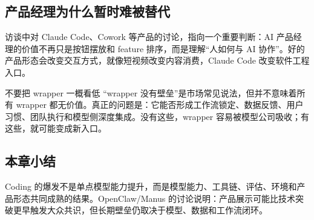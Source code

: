 \subsection{产品经理为什么暂时难被替代}

访谈中对 Claude Code、Cowork 等产品的讨论，指向一个重要判断：AI 产品经理的价值不再只是按钮摆放和 feature 排序，而是理解“人如何与 AI 协作”。好的产品形态会改变交互方式，就像短视频改变内容消费，Claude Code 改变软件工程入口。

\begin{warningbox}{不要把 wrapper 一概看低}
“wrapper 没有壁垒”是市场常见说法，但并不意味着所有 wrapper 都无价值。真正的问题是：它能否形成工作流锁定、数据反馈、用户习惯、团队执行和模型侧深度集成。没有这些，wrapper 容易被模型公司吸收；有这些，就可能变成新入口。
\end{warningbox}

\subsection{本章小结}

Coding 的爆发不是单点模型能力提升，而是模型能力、工具链、评估、环境和产品形态共同成熟的结果。OpenClaw/Manus 的讨论说明：产品展示可能比技术突破更早触发大众共识，但长期壁垒仍取决于模型、数据和工作流闭环。

